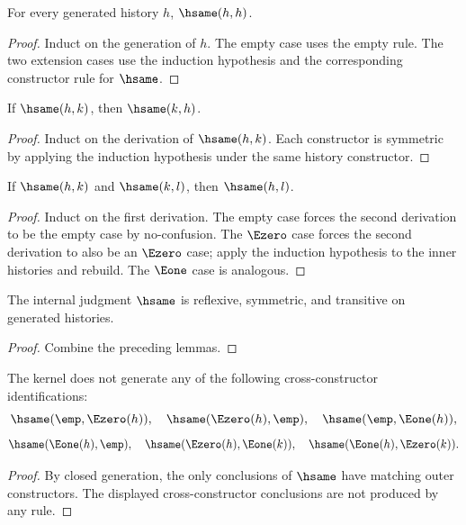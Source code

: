 \begin{lemma}
For every generated history \(h\), \(\hsame(h,h)\).
\end{lemma}
\begin{proof}
Induct on the generation of \(h\). The empty case uses the empty rule. The two extension cases use the induction hypothesis and the corresponding constructor rule for \(\hsame\).
\end{proof}

\begin{lemma}
If \(\hsame(h,k)\), then \(\hsame(k,h)\).
\end{lemma}
\begin{proof}
Induct on the derivation of \(\hsame(h,k)\). Each constructor is symmetric by applying the induction hypothesis under the same history constructor.
\end{proof}

\begin{lemma}
If \(\hsame(h,k)\) and \(\hsame(k,l)\), then \(\hsame(h,l)\).
\end{lemma}
\begin{proof}
Induct on the first derivation. The empty case forces the second derivation to be the empty case by no-confusion. The \(\Ezero\) case forces the second derivation to also be an \(\Ezero\) case; apply the induction hypothesis to the inner histories and rebuild. The \(\Eone\) case is analogous.
\end{proof}

\begin{theorem}
\label{thm:history-sameness-equivalence}
The internal judgment \(\hsame\) is reflexive, symmetric, and transitive on generated histories.
\end{theorem}
\begin{proof}
Combine the preceding lemmas.
\end{proof}

\begin{theorem}
The kernel does not generate any of the following cross-constructor identifications:
$$
\hsame(\emp,\Ezero(h)),\quad
\hsame(\Ezero(h),\emp),\quad
\hsame(\emp,\Eone(h)),
$$
$$
\hsame(\Eone(h),\emp),\quad
\hsame(\Ezero(h),\Eone(k)),\quad
\hsame(\Eone(h),\Ezero(k)).
$$
\end{theorem}
\begin{proof}
By closed generation, the only conclusions of \(\hsame\) have matching outer constructors. The displayed cross-constructor conclusions are not produced by any rule.
\end{proof}

